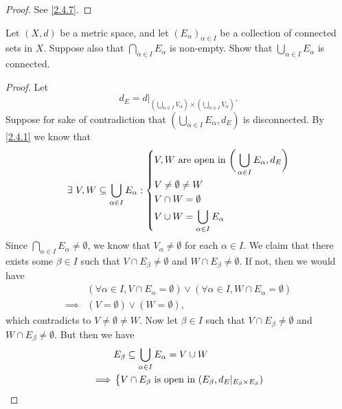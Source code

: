 \begin{proof}
  See \cref{2.4.7}.
\end{proof}

\begin{ex}\label{ex:2.4.6}
  Let \((X, d)\) be a metric space, and let \((E_\alpha)_{\alpha \in I}\) be a collection of connected sets in \(X\).
  Suppose also that \(\bigcap_{\alpha \in I} E_\alpha\) is non-empty.
  Show that \(\bigcup_{\alpha \in I} E_\alpha\) is connected.
\end{ex}

\begin{proof}
  Let
  \[
    d_E = d|_{(\bigcup_{\alpha \in I} V_\alpha) \times (\bigcup_{\alpha \in I} V_\alpha)}.
  \]
  Suppose for sake of contradiction that \((\bigcup_{\alpha \in I} E_\alpha, d_E)\) is disconnected.
  By \cref{2.4.1} we know that
  \[
    \exists\ V, W \subseteq \bigcup_{\alpha \in I} E_\alpha : \begin{dcases}
      V, W \text{ are open in } \bigg(\bigcup_{\alpha \in I} E_\alpha, d_E\bigg) \\
      V \neq \emptyset \neq W                                                    \\
      V \cap W = \emptyset                                                       \\
      V \cup W = \bigcup_{\alpha \in I} E_\alpha
    \end{dcases}
  \]
  Since \(\bigcap_{\alpha \in I} E_\alpha \neq \emptyset\), we know that \(V_\alpha \neq \emptyset\) for each \(\alpha \in I\).
  We claim that there exists some \(\beta \in I\) such that \(V \cap E_\beta \neq \emptyset\) and \(W \cap E_\beta \neq \emptyset\).
  If not, then we would have
  \begin{align*}
             & (\forall \alpha \in I, V \cap E_\alpha = \emptyset) \lor (\forall \alpha \in I, W \cap E_\alpha = \emptyset) \\
    \implies & (V = \emptyset) \lor (W = \emptyset),
  \end{align*}
  which contradicts to \(V \neq \emptyset \neq W\).
  Now let \(\beta \in I\) such that \(V \cap E_\beta \neq \emptyset\) and \(W \cap E_\beta \neq \emptyset\).
  But then we have
  \begin{align*}
             & E_\beta \subseteq \bigcup_{\alpha \in I} E_\alpha = V \cup W                                                 \\
    \implies & \begin{dcases}
                 V \cap E_\beta \text{ is open in } (E_\beta, d_E|_{E_\beta \times E_\beta}) \\

\end{dcases}
\end{align*}
\end{proof}

